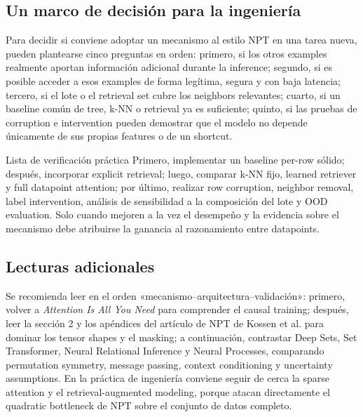 \subsection{Un marco de decisión para la ingeniería}

Para decidir si conviene adoptar un mecanismo al estilo NPT en una tarea nueva, pueden plantearse cinco preguntas en orden: primero, si los otros examples realmente aportan información adicional durante la inference; segundo, si es posible acceder a esos examples de forma legítima, segura y con baja latencia; tercero, si el lote o el retrieval set cubre los neighbors relevantes; cuarto, si un baseline común de tree, k-NN o retrieval ya es suficiente; quinto, si las pruebas de corruption e intervention pueden demostrar que el modelo no depende únicamente de sus propias features o de un shortcut.

\begin{knowledgebox}{Lista de verificación práctica}
Primero, implementar un baseline per-row sólido; después, incorporar explicit retrieval; luego, comparar k-NN fijo, learned retriever y full datapoint attention; por último, realizar row corruption, neighbor removal, label intervention, análisis de sensibilidad a la composición del lote y OOD evaluation. Solo cuando mejoren a la vez el desempeño y la evidencia sobre el mecanismo debe atribuirse la ganancia al razonamiento entre datapoints.
\end{knowledgebox}

\subsection{Lecturas adicionales}

Se recomienda leer en el orden «mecanismo--arquitectura--validación»: primero, volver a \emph{Attention Is All You Need} para comprender el causal training; después, leer la sección 2 y los apéndices del artículo de NPT de Kossen et al. para dominar los tensor shapes y el masking; a continuación, contrastar Deep Sets, Set Transformer, Neural Relational Inference y Neural Processes, comparando permutation symmetry, message passing, context conditioning y uncertainty assumptions. En la práctica de ingeniería conviene seguir de cerca la sparse attention y el retrieval-augmented modeling, porque atacan directamente el quadratic bottleneck de NPT sobre el conjunto de datos completo.



